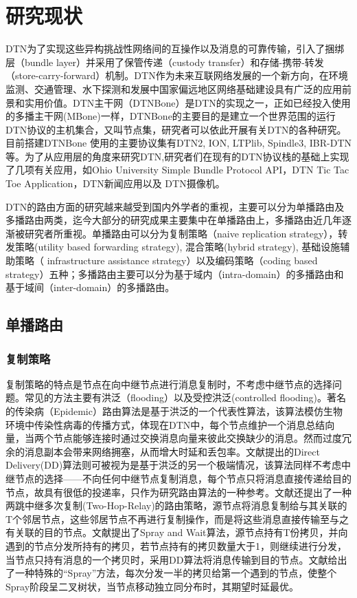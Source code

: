 \chapter{研究现状}

DTN为了实现这些异构挑战性网络间的互操作以及消息的可靠传输，引入了捆绑层（bundle layer）并采用了保管传递（custody transfer）和存储-携带-转发（store-carry-forward）机制。DTN作为未来互联网络发展的一个新方向，在环境监测、交通管理、水下探测和发展中国家偏远地区网络基础建设具有广泛的应用前景和实用价值。DTN主干网（DTNBone）是DTN的实现之一，正如已经投入使用的多播主干网(MBone)一样，DTNBone的主要目的是建立一个世界范围的运行DTN协议的主机集合，又叫节点集，研究者可以依此开展有关DTN的各种研究。目前搭建DTNBone 使用的主要协议集有DTN2, ION, LTPlib, Spindle3, IBR-DTN等。为了从应用层的角度来研究DTN,研究者们在现有的DTN协议栈的基础上实现了几项有关应用，如Ohio University Simple Bundle Protocol API，DTN Tic Tac Toe Application，DTN新闻应用以及 DTN摄像机。

DTN的路由方面的研究越来越受到国内外学者的重视，主要可以分为单播路由及多播路由两类，迄今大部分的研究成果主要集中在单播路由上，多播路由近几年逐渐被研究者所重视。单播路由可以分为复制策略（naive replication strategy），转发策略(utility based forwarding strategy), 混合策略(hybrid strategy), 基础设施辅助策略（ infrastructure assistance strategy）以及编码策略（coding based strategy）五种；多播路由主要可以分为基于域内（intra-domain）的多播路由和基于域间（inter-domain）的多播路由。

\section{单播路由}
\subsection{复制策略}
复制策略的特点是节点在向中继节点进行消息复制时，不考虑中继节点的选择问题。常见的方法主要有洪泛（flooding）以及受控洪泛(controlled flooding)。著名的传染病（Epidemic）路由算法\cite{Vahdat2000}是基于洪泛的一个代表性算法，该算法模仿生物环境中传染性病毒的传播方式，体现在DTN中，每个节点维护一个消息总结向量，当两个节点能够连接时通过交换消息向量来彼此交换缺少的消息。然而过度冗余的消息副本会带来网络拥塞，从而增大时延和丢包率。文献\cite{Grossglauser2002}提出的Direct Delivery(DD)算法则可被视为是基于洪泛的另一个极端情况，该算法同样不考虑中继节点的选择——不向任何中继节点复制消息，每个节点只将消息直接传递给目的节点，故具有很低的投递率，只作为研究路由算法的一种参考。文献\cite{Grossglauser2002}还提出了一种两跳中继多次复制(Two-Hop-Relay)的路由策略，源节点将消息复制给与其关联的T个邻居节点，这些邻居节点不再进行复制操作，而是将这些消息直接传输至与之有关联的目的节点。文献\cite{Spyropoulos2005}提出了Spray and Wait算法，源节点持有T份拷贝，并向遇到的节点分发所持有的拷贝，若节点持有的拷贝数量大于1，则继续进行分发，当节点只持有消息的一个拷贝时，采用DD算法将消息传输到目的节点。文献\cite{Spyropoulos2007a}给出了一种特殊的“Spray”方法，每次分发一半的拷贝给第一个遇到的节点，使整个Spray阶段呈二叉树状，当节点移动独立同分布时，其期望时延最优。


